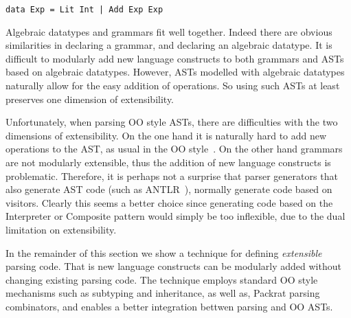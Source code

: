 \begin{lstlisting}
data Exp = Lit Int | Add Exp Exp
\end{lstlisting}

Algebraic datatypes and grammars fit well together. Indeed there are
obvious similarities in declaring a grammar, and declaring an
algebraic datatype. It is difficult to modularly add new language
constructs to both grammars and ASTs based on algebraic datatypes. However,
ASTs modelled with algebraic datatypes naturally allow for the easy
addition of operations. So using such ASTs at least preserves one
dimension of extensibility.

Unfortunately, when parsing OO style ASTs, there are difficulties with
the two dimensions of extensibility. On the one hand it is naturally hard to
add new operations to the AST, as usual in the OO
style~\cite{wadler1998expression}. On the other hand
grammars are not modularly extensible, thus the addition of new
language constructs is problematic. Therefore,
it is perhaps not a surprise that parser generators that also generate
AST code (such as ANTLR~\cite{parr2013definitive}), normally generate code based on
visitors. Clearly this seems a better choice since generating code
based on the {\sc Interpreter} or {\sc Composite} pattern would
simply be too inflexible, due to the dual limitation on extensibility.

In the remainder of this section we show a technique for
defining \emph{extensible} parsing code. That is new
language constructs can be modularly added without changing
existing parsing code. The technique employs standard OO
style mechanisms such as subtyping and inheritance, as well as,
Packrat parsing combinators, and enables a better integration bettwen 
parsing and OO ASTs.


